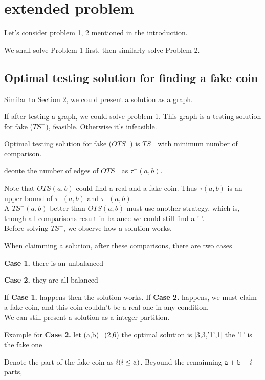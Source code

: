 \section{extended problem}
Let's consider problem 1, 2 mentioned in the introduction.

We shall solve Problem 1 first, then similarly solve Problem 2.


\subsection*{Optimal testing solution for finding a fake coin}
Similar to Section 2, we could present a solution as a graph.

If after testing a graph, we could solve problem 1.
This graph is a testing solution for fake ($TS^-$), feasible. Otherwise it's infeasible.

\begin{definition}
Optimal testing solution for fake ($OTS^-$) is $TS^-$ with minimum number of comparison.

deonte the number of edges of $OTS^-$ as $\tau^-(a,b)$.
\end{definition}

Note that $OTS(a,b)$ could find a real and a fake coin. Thus $\tau(a,b)$
is an upper bound of $\tau^+(a,b)$ and $\tau^-(a,b)$.\\

A $TS^-(a,b)$ better than $OTS(a,b)$ must use another strategy, which is, though all comparisons result in balance we could still find a '-'.\\

Before solving $TS^-$, we observe how a solution works.

When claimming a solution, after these comparisons, there are two cases

\textbf{Case 1.} there is an unbalanced

\textbf{Case 2.} they are all balanced

If \textbf{Case 1.} happens then the solution works.
If \textbf{Case 2.} happens, we must claim a fake coin, and this coin couldn't be a real one in any condition.\\

We can still present a solution as a integer partition.

Example for \textbf{Case 2.} let (a,b)=(2,6)
the optimal solution is [3,3,'1',1] the '1' is the fake one

Denote the part of the fake coin as $i(i\leq\mathtt{a})$. 
Beyound the remainning $\mathtt{a}+\mathtt{b}-i$ parts, 

